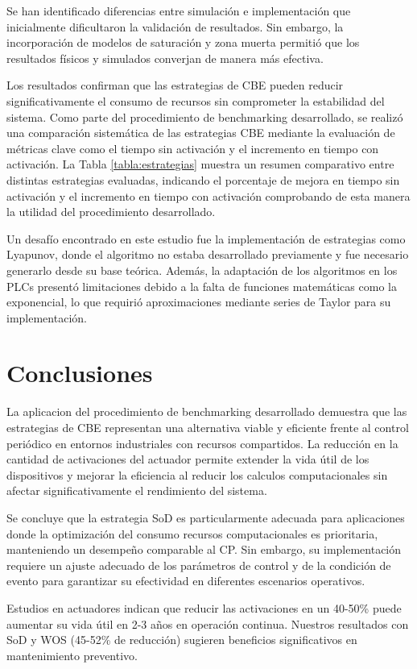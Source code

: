 \documentclass[conference]{IEEEtran}
\begin{document}
Se han identificado diferencias entre simulación e implementación que inicialmente dificultaron la validación de resultados. Sin embargo, la incorporación de modelos de saturación y zona muerta permitió que los resultados físicos y simulados converjan de manera más efectiva.

Los resultados confirman que las estrategias de CBE pueden reducir significativamente el consumo de recursos sin comprometer la estabilidad del sistema.
Como parte del procedimiento de benchmarking desarrollado, se realizó una comparación sistemática de las estrategias CBE mediante la evaluación de métricas clave como el tiempo sin activación y el incremento en tiempo con activación. La Tabla \ref{tabla:estrategias} muestra un resumen comparativo entre distintas estrategias evaluadas, indicando el porcentaje de mejora en tiempo sin activación y el incremento en tiempo con activación comprobando de esta manera la utilidad del procedimiento desarrollado.

Un desafío encontrado en este estudio fue la implementación de estrategias como Lyapunov, donde el algoritmo no estaba desarrollado previamente y fue necesario generarlo desde su base teórica. Además, la adaptación de los algoritmos en los PLCs presentó limitaciones debido a la falta de funciones matemáticas como la exponencial, lo que requirió aproximaciones mediante series de Taylor para su implementación.

\section{Conclusiones}
La aplicacion del procedimiento de benchmarking desarrollado demuestra que las estrategias de CBE representan una alternativa viable y eficiente frente al control periódico en entornos industriales con recursos compartidos. La reducción en la cantidad de activaciones del actuador permite extender la vida útil de los dispositivos y mejorar la eficiencia al reducir los calculos computacionales sin afectar significativamente el rendimiento del sistema.

Se concluye que la estrategia SoD es particularmente adecuada para aplicaciones donde la optimización del consumo recursos computacionales es prioritaria, manteniendo un desempeño comparable al CP. Sin embargo, su implementación requiere un ajuste adecuado de los parámetros de control y de la condición de evento para garantizar su efectividad en diferentes escenarios operativos.

Estudios en actuadores indican que reducir las activaciones en un 40-50\% puede aumentar su vida útil en 2-3 años en operación continua. Nuestros resultados con SoD y WOS (45-52\% de reducción) sugieren beneficios significativos en mantenimiento preventivo.
\end{document}
